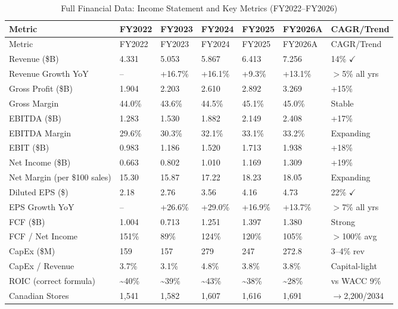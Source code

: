 \documentclass[11pt]{article}
\begin{document}
\begingroup
\small
\setlength{\tabcolsep}{4pt}
\setlength{\LTleft}{0pt}
\setlength{\LTright}{0pt}
\begin{longtable}{P{3.6cm} C{1.4cm} C{1.4cm} C{1.4cm} C{1.4cm} C{1.6cm} P{2.6cm}}
\caption{Full Financial Data: Income Statement and Key Metrics (FY2022--FY2026)}\\
\toprule
{}
Metric & FY2022 & FY2023 & FY2024 & FY2025 & FY2026A & CAGR/Trend \\
\midrule
\endfirsthead
\toprule
{}
Metric & FY2022 & FY2023 & FY2024 & FY2025 & FY2026A & CAGR/Trend \\
\midrule
\endhead
Revenue (\$B) & 4.331 & 5.053 & 5.867 & 6.413 & 7.256 & 14\% $\checkmark$ \\
Revenue Growth YoY & -- & +16.7\% & +16.1\% & +9.3\% & +13.1\% & $>$5\% all yrs \\
Gross Profit (\$B) & 1.904 & 2.203 & 2.610 & 2.892 & 3.269 & +15\% \\
Gross Margin & 44.0\% & 43.6\% & 44.5\% & 45.1\% & 45.0\% & Stable \\
EBITDA (\$B) & 1.283 & 1.530 & 1.882 & 2.149 & 2.408 & +17\% \\
EBITDA Margin & 29.6\% & 30.3\% & 32.1\% & 33.1\% & 33.2\% & Expanding \\
EBIT (\$B) & 0.983 & 1.186 & 1.520 & 1.713 & 1.938 & +18\% \\
Net Income (\$B) & 0.663 & 0.802 & 1.010 & 1.169 & 1.309 & +19\% \\
Net Margin (per \$100 sales) & 15.30 & 15.87 & 17.22 & 18.23 & 18.05 & Expanding \\
Diluted EPS (\$) & 2.18 & 2.76 & 3.56 & 4.16 & 4.73 & 22\% $\checkmark$ \\
EPS Growth YoY & -- & +26.6\% & +29.0\% & +16.9\% & +13.7\% & $>$7\% all yrs \\
FCF (\$B) & 1.004 & 0.713 & 1.251 & 1.397 & 1.380 & Strong \\
FCF / Net Income & 151\% & 89\% & 124\% & 120\% & 105\% & $>$100\% avg \\
CapEx (\$M) & 159 & 157 & 279 & 247 & 272.8 & 3--4\% rev \\
CapEx / Revenue & 3.7\% & 3.1\% & 4.8\% & 3.8\% & 3.8\% & Capital-light \\
ROIC (correct formula) & \textasciitilde{}40\% & \textasciitilde{}39\% & \textasciitilde{}43\% & \textasciitilde{}38\% & \textasciitilde{}28\% & vs WACC 9\% \\
Canadian Stores & 1,541 & 1,582 & 1,607 & 1,616 & 1,691 & $\to$2,200/2034 \\
\bottomrule
\end{longtable}
\endgroup
\end{document}
